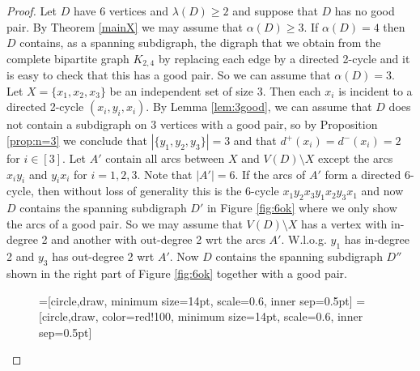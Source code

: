 \documentclass{article}
\theoremstyle{definition}
\newcommand{\AY}[1]{{#1}}
\newcommand{\2}{\vspace{0.2cm}}
\begin{document}
  \begin{proof}
    Let $D$ have 6 vertices and $\lambda{}(D)\geq 2$ and suppose that
    $D$ has no good pair.  By Theorem \ref{mainX} we may assume that
    $\alpha{}(D)\geq 3$. If $\alpha{}(D)=4$ then $D$ contains, as a
    spanning subdigraph, the digraph that we obtain from the complete
    bipartite graph $K_{2,4}$ by replacing each edge by a directed
    2-cycle and it is easy to check that this has a good pair. So we
    can assume that $\alpha{}(D)=3$. Let $X=\{x_1,x_2,x_3\}$ be an
    independent set of size 3. Then each $x_i$ is incident to a
    directed 2-cycle $(x_i,y_i,x_i)$. By Lemma \ref{lem:3good}, we can assume that
    $D$ does not contain a subdigraph on 3 vertices with a good pair,
    so by Proposition \ref{prop:n=3} we conclude that
    $|\{y_1,y_2,y_3\}|=3$ and that $d^+(x_i)=d^-(x_i)=2$ for $i\in
    \AY{[3]}$. \AY{ Let $A'$ contain all arcs between $X$ and $V(D)\setminus X$ except the arcs $x_iy_i$ and $y_ix_i$ for $i=1,2,3$.
    Note that $|A'|=6$.  
    If the arcs of $A'$} form a directed 6-cycle, then without loss of
    generality this is the 6-cycle $x_1y_2x_3y_1x_2y_3x_1$ and now $D$
    contains the spanning subdigraph $D'$ in Figure \ref{fig:6ok}
    where we only show the arcs of a good pair. So we may assume that
    $V(D)\setminus X$ has a vertex with in-degree 2 and another with out-degree 2
    wrt the arcs $A'$. W.l.o.g. $y_1$ has in-degree 2 and $y_3$ has
    out-degree 2 wrt $A'$. Now $D$ contains the spanning subdigraph
    $D''$ shown in the right part of Figure \ref{fig:6ok} together
    with a good pair.

    \begin{figure}[H]
\begin{center}
=[circle,draw, minimum size=14pt, scale=0.6, inner sep=0.5pt]
=[circle,draw, color=red!100, minimum size=14pt, scale=0.6, inner sep=0.5pt]

\end{center}
\end{figure}
\end{proof}
\end{document}
